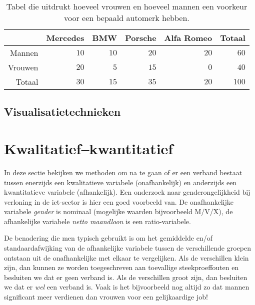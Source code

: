 \begin{table} \centering
  \begin{tabular}{@{}rrrrrr@{}}
  	\toprule
  	        & Mercedes &  BMW & Porsche & Alfa Romeo & Totaal \\
  	\midrule
  	 Mannen &     $10$ & $10$ &    $20$ &       $20$ &   $60$ \\
  	Vrouwen &     $20$ &  $5$ &    $15$ &        $0$ &   $40$ \\
  	 Totaal &     $30$ & $15$ &    $35$ &       $20$ &  $100$ \\
  	\bottomrule
  \end{tabular}
  \caption{Tabel die uitdrukt hoeveel vrouwen en hoeveel mannen een voorkeur voor een bepaald automerk hebben.}
  \label{tab:autovoorkeur}
\end{table}

\subsection{Visualisatietechnieken}
\label{ssec:kwal-kwal-visualisatie}


\section{Kwalitatief--kwantitatief}

In deze sectie bekijken we methoden om na te gaan of er een verband bestaat tussen enerzijds een kwalitatieve variabele (onafhankelijk) en anderzijds een kwantitatieve variabele (afhankelijk). Een onderzoek naar genderongelijkheid bij verloning in de ict-sector is hier een goed voorbeeld van. De onafhankelijke variabele \emph{gender} is nominaal (mogelijke waarden bijvoorbeeld M/V/X), de afhankelijke variabele \emph{netto maandloon} is een ratio-variabele.

De benadering die men typisch gebruikt is om het gemiddelde en/of standaardafwijking van de afhankelijke variabele tussen de verschillende groepen ontstaan uit de onafhankelijke met elkaar te vergelijken. Als de verschillen klein zijn, dan kunnen ze worden toegeschreven aan toevallige steekproeffouten en besluiten we dat er geen verband is. Als de verschillen groot zijn, dan besluiten we dat er \emph{wel} een verband is. Vaak is het bijvoorbeeld nog altijd zo dat mannen significant meer verdienen dan vrouwen voor een gelijkaardige job!

